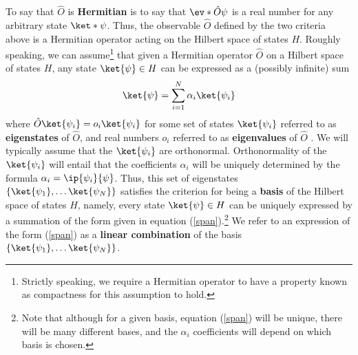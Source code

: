 To say that $\hat{O}$ is \textbf{Hermitian} is to say that $\ev*{\hat{O}}{\psi}$ is a real number for any arbitrary state $\ket*{\psi}$. Thus, the observable $\hat{O}$ defined by the two criteria above is a Hermitian operator acting on the Hilbert space of states $H$. Roughly speaking, we can assume\footnote{Strictly speaking, we require a Hermitian operator to have a property known as compactness for this assumption to hold.}  that given a Hermitian operator $\hat{O}$ on a Hilbert space of states $H$, any state $\ket{\psi}\in H$ can be expressed as a (possibly infinite) sum 
\begin{equation}\label{span}
\ket{\psi}=\sum_{i=1}^N\alpha_i\ket{\psi_i}
\end{equation}
where $\hat{O}\ket{\psi_i}=o_i\ket{\psi_i}$ for some set of states $\ket{\psi_i}$ referred to as \textbf{eigenstates} of $\hat{O}$, and real numbers $o_i$ referred to as \textbf{eigenvalues} of $\hat{O}$ . We will typically assume that the $\ket{\psi_i}$ are orthonormal. Orthonormality of the $\ket{\psi_i}$ will entail that the coefficients $\alpha_i$ will be uniquely determined by the formula $\alpha_i=\ip{\psi_i}{\psi}$. Thus, this set of eigenstates $\{\ket{\psi_1},\ldots\ket{\psi_N}\}$ satisfies the criterion for being a \textbf{basis} of the Hilbert space of states $H$, namely, every state $\ket{\psi}\in H$ can be uniquely expressed by a summation of the form given in equation (\ref{span}).\footnote{Note that although for a given basis, equation (\ref{span}) will be unique, there will be many different bases, and the $\alpha_i$ coefficients will depend on which basis is chosen.} We refer to an expression of the form (\ref{span}) as a \textbf{linear combination} of the basis $\{\ket{\psi_1},\ldots\ket{\psi_N}\}$. 
